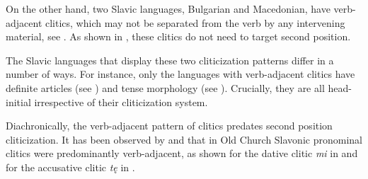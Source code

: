 \documentclass[output=paper,
modfonts,
newtxmath,
hidelinks
]{langscibook}
\begin{document}
\ea \label{ex6}
	 \label{ex6a}
    \label{ex6b}
    \label{ex6c}
	\z
\z
On the other hand, two Slavic languages, Bulgarian and Macedonian, have verb-adjacent clitics, which may not be separated from the verb by any intervening material, see . As shown in , these clitics do not need to target second position. 

\ea \label{ex7}
	\label{ex7a}
 	\label{ex7b}
 	\z
\z
The Slavic languages that display these two cliticization patterns differ in a number of ways. For instance, only the languages with verb-adjacent clitics have definite articles (see \citealt{boskovic2016}) and tense morphology (see \citealt{migdalski2015,migdalski2016}). Crucially, they are all head-initial irrespective of their cliticization system.

Diachronically, the verb-adjacent pattern of clitics predates second position cliticization. It has been observed by \citet{radanovickocic1988} and \citet{pancheva2005} that in Old Church Slavonic pronominal clitics were predominantly verb-adjacent, as shown for the dative clitic \textit{mi} in  and for the accusative clitic \textit{tę} in .
\end{document}

